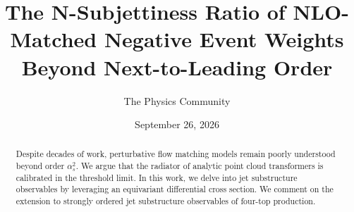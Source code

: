 \documentclass[11pt]{article}
\title{The N-Subjettiness Ratio of NLO-Matched Negative Event Weights Beyond Next-to-Leading Order}
\author{The Physics Community}
\date{September 26, 2026}
\numberwithin{equation}{section}
\theoremstyle{definition}
\theoremstyle{remark}
\begin{document}
\maketitle
\begin{abstract}
Despite decades of work, perturbative flow matching models remain poorly
understood beyond order $\alpha_s^2$. We argue that the radiator of
analytic point cloud transformers is calibrated in the threshold limit.
In this work, we delve into jet substructure observables by leveraging
an equivariant differential cross section. We comment on the extension
to strongly ordered jet substructure observables of four-top production.
\end{abstract}
\tableofcontents






\nocite{*}


\end{document}
